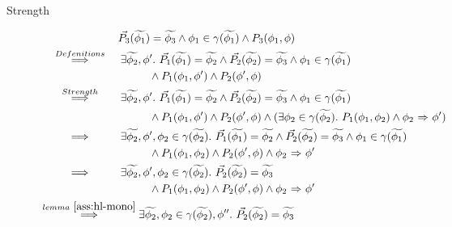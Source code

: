 \begin{proofatend}
\begin{description}
        \item[Strength]
        \begin{align*}
        & \phantom{\overset{}{~\quad\quad\implies\quad\quad~}}~
        \dgrad{P_3}(\grad{\phi_1}) = \grad{\phi_3} \wedge \phi_1 \in \gamma(\grad{\phi_1}) \wedge P_3(\phi_1, \phi)\\
        & \overset{Defenitions}{~\quad\quad\implies\quad\quad~} 
        \exists \grad{\phi_2}, \phi'.~ 
        \dgrad{P_1}(\grad{\phi_1}) = \grad{\phi_2} \wedge \dgrad{P_2}(\grad{\phi_2}) = \grad{\phi_3} \wedge 
        \phi_1 \in \gamma(\grad{\phi_1}) \\
        & \quad\quad\quad\quad\quad\quad\quad\quad\quad\quad
        \wedge P_1(\phi_1, \phi') \wedge P_2(\phi', \phi)\\
        & \overset{Strength}{~\quad\quad\implies\quad\quad~} 
        \exists \grad{\phi_2}, \phi'.~ 
        \dgrad{P_1}(\grad{\phi_1}) = \grad{\phi_2} \wedge \dgrad{P_2}(\grad{\phi_2}) = \grad{\phi_3} \wedge 
        \phi_1 \in \gamma(\grad{\phi_1}) \\
        & \quad\quad\quad\quad\quad\quad\quad\quad\quad\quad
        \wedge P_1(\phi_1, \phi') \wedge P_2(\phi', \phi)
        \wedge (\exists \phi_2 \in \gamma(\grad{\phi_2}).~ P_1(\phi_1, \phi_2) \wedge \phiImplies{\phi_2}{\phi'}) \\
        & \overset{}{~\quad\quad\implies\quad\quad~} 
        \exists \grad{\phi_2}, \phi', \phi_2 \in \gamma(\grad{\phi_2}).~ 
        \dgrad{P_1}(\grad{\phi_1}) = \grad{\phi_2} \wedge \dgrad{P_2}(\grad{\phi_2}) = \grad{\phi_3} \wedge 
        \phi_1 \in \gamma(\grad{\phi_1}) \\
        & \quad\quad\quad\quad\quad\quad\quad\quad\quad\quad
        \wedge P_1(\phi_1, \phi_2) \wedge P_2(\phi', \phi)
        \wedge \phiImplies{\phi_2}{\phi'} \\
        & \overset{}{~\quad\quad\implies\quad\quad~} 
        \exists \grad{\phi_2}, \phi', \phi_2 \in \gamma(\grad{\phi_2}).~ 
        \dgrad{P_2}(\grad{\phi_2}) = \grad{\phi_3}  \\
        & \quad\quad\quad\quad\quad\quad\quad\quad\quad\quad
        \wedge P_1(\phi_1, \phi_2) \wedge P_2(\phi', \phi)
        \wedge \phiImplies{\phi_2}{\phi'} \\
        & \overset{lemma~\ref{ass:hl-mono}}{~\quad\quad\implies\quad\quad~} 
        \exists \grad{\phi_2}, \phi_2 \in \gamma(\grad{\phi_2}), \phi''.~ 
        \dgrad{P_2}(\grad{\phi_2}) = \grad{\phi_3}   \\
        & \quad\quad\quad\quad\quad\quad\quad\quad\quad\quad

\end{align*}
\end{description}
\end{proofatend}
